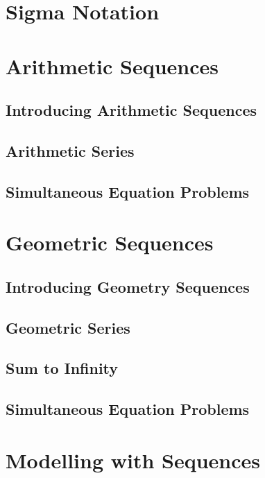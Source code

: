 \documentclass[../maths.tex]{subfiles}
\begin{document}
\section{Sigma Notation}
\section{Arithmetic Sequences}
\subsection*{Introducing Arithmetic Sequences}
\subsection*{Arithmetic Series}
\subsection*{Simultaneous Equation Problems}
\section{Geometric Sequences}
\subsection*{Introducing Geometry Sequences}
\subsection*{Geometric Series}
\subsection*{Sum to Infinity}
\subsection*{Simultaneous Equation Problems}
\section{Modelling with Sequences}
\end{document}
